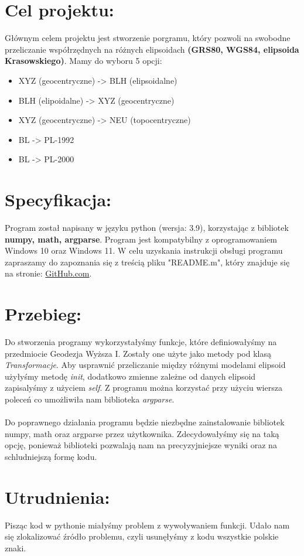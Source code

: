 \documentclass[a4paper]{article}
\begin{document}
\section{Cel projektu:}
Głównym celem projektu jest stworzenie porgramu, który pozwoli na swobodne przeliczanie współrzędnych na różnych elipsoidach 
\textbf{(GRS80, WGS84, elipsoida Krasowskiego)}. Mamy do wyboru 5 opcji:
	\begin{itemize}
		\item XYZ (geocentryczne) -> BLH (elipsoidalne)
		\item BLH (elipoidalne) -> XYZ (geocentryczne)
		\item XYZ (geocentryczne) -> NEU (topocentryczne)
		\item BL -> PL-1992
		\item BL -> PL-2000
	\end{itemize}

\section{Specyfikacja:}
Program został napisany w języku python (wersja: 3.9), korzystając z bibliotek \textbf{numpy, math, argparse}. Program jest kompatybilny z oprogramowaniem Windows 10 oraz Windows 11. W celu uzyskania instrukcji obsługi programu zapraszamy do zapoznania się z treścią pliku "README.m", który znajduje się na stronie: 
\href{https://github.com/AndzelikaBan/Projekt_1_INF}{GitHub.com}.

\section{Przebieg:}
Do stworzenia programy wykorzystałyśmy funkcje, które definiowałyśmy na przedmiocie Geodezja Wyższa I. Zostały one użyte jako metody pod klasą \textit{Transformacje}. Aby usprawnić przeliczanie między różnymi modelami elipsoid użyłyśmy metodę \textit{init}, dodatkowo zmienne zależne od danych elipsoid zapisalyśmy z użyciem \textit{self}. Z programu można korzystać przy użyciu wiersza poleceń co umożliwiła nam biblioteka \textit{argparse}.  \\
\\
Do poprawnego działania programu będzie niezbędne zainstalowanie bibliotek numpy, math oraz argparse przez użytkownika. Zdecydowałyśmy się na taką opcję, ponieważ biblioteki pozwalają nam na precyzyjniejsze wyniki oraz na schludniejszą formę kodu. 

\section{Utrudnienia:}
Pisząc kod w pythonie miałyśmy problem z wywoływaniem funkcji. Udało nam się zlokalizować źródło problemu, czyli usunęłyśmy z kodu wszystkie polskie znaki. 
\end{document}
